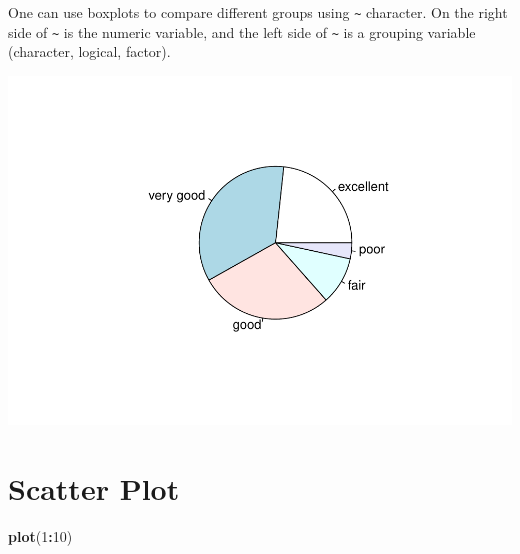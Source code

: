 \documentclass[
]{book}
\newenvironment{Shaded}{\begin{snugshade}}{\end{snugshade}}
\newcommand{\DecValTok}[1]{\textcolor[rgb]{0.00,0.00,0.81}{#1}}
\newcommand{\KeywordTok}[1]{\textcolor[rgb]{0.13,0.29,0.53}{\textbf{#1}}}
\newcommand{\NormalTok}[1]{#1}
\newcommand{\OperatorTok}[1]{\textcolor[rgb]{0.81,0.36,0.00}{\textbf{#1}}}
\newcommand{\StringTok}[1]{\textcolor[rgb]{0.31,0.60,0.02}{#1}}
\begin{document}
One can use boxplots to compare different groups using \texttt{\textasciitilde{}} character. On the right side of \texttt{\textasciitilde{}} is the numeric variable, and the left side of \texttt{\textasciitilde{}} is a grouping variable (character, logical, factor).

\begin{Shaded}
\end{Shaded}

\includegraphics{_main_files/figure-latex/unnamed-chunk-137-1.pdf}

\hypertarget{scatter-plot}{%
\section{Scatter Plot}\label{scatter-plot}}

\begin{Shaded}
\begin{Highlighting}[]
\KeywordTok{plot}\NormalTok{(}\DecValTok{1}\OperatorTok{:}\DecValTok{10}\NormalTok{)}
\end{Highlighting}
\end{Shaded}
\end{document}
